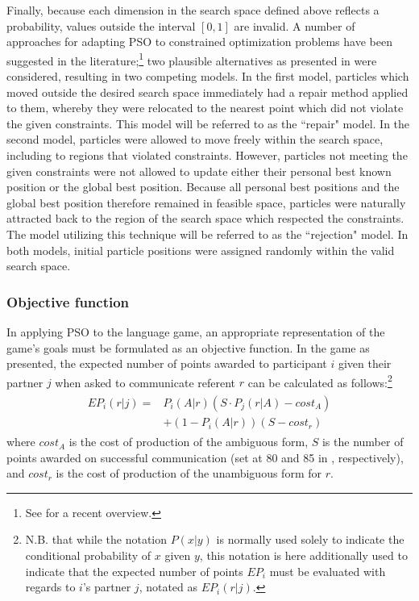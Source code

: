 \documentclass[11pt]{article}
\begin{document}
Finally, because each dimension in the search space defined above reflects a probability, values outside the interval $[0, 1]$ are invalid. A number of approaches for adapting PSO to constrained optimization problems have been suggested in the literature;\footnote{See \cite{helwig2010} for a recent overview.} two plausible alternatives as presented in \cite{engelbrecht2005} were considered, resulting in two competing models. 
In the first model, particles which moved outside the desired search space immediately had a repair method applied to them, whereby they were relocated to the nearest point which did not violate the given constraints. This model will be referred to as the ``repair" model. In the second model, particles were allowed to move freely within the search space, including to regions that violated constraints. However, particles not meeting the given constraints were not allowed to update either their personal best known position or the global best position. Because all personal best positions and the global best position therefore remained in feasible space, particles were naturally attracted back to the region of the search space which respected the constraints. The model utilizing this technique will be referred to as the ``rejection" model. In both models, initial particle positions were assigned randomly within the valid search space.


 
\subsubsection{Objective function}
\label{sec:objective_func}
In applying PSO to the \citeauthor{rohde2012} language game, an appropriate representation of the game's goals must be formulated as an objective function. In the game as presented, the expected number of points awarded to participant $i$ given their partner $j$ when asked to communicate referent $r$ can be calculated as follows:\footnote{N.B. that while the notation $P(x|y)$ is normally used solely to indicate the conditional probability of $x$ given $y$, this notation is here additionally used to indicate that the expected number of points $EP_i$ must be evaluated with regards to $i$'s partner $j$, notated as $EP_{i}(r|j)$.}
\begin{multline}
\begin{split}
EP_{i}(r|j) = & P_i(A|r)(S \cdot P_j(r|A) - cost_A) \\
              & + (1 - P_i(A|r))(S - cost_r) 
\end{split}
\end{multline}
where $cost_A$ is the cost of production of the ambiguous form, $S$ is the number of points awarded on successful communication (set at 80 and 85 in \citeauthor{rohde2012}, respectively), and $cost_r$ is the cost of production of the unambiguous form for $r$.
\end{document}
